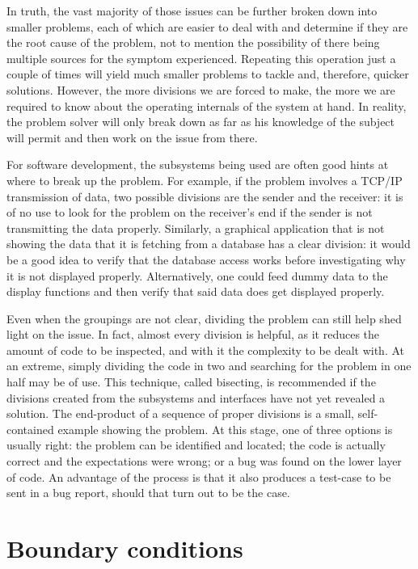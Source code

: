 In truth, the vast majority of those issues can be further broken down into smaller problems, each of which are easier to deal with and determine if they are the root cause of the problem, not to mention the possibility of there being multiple sources for the symptom experienced. Repeating this operation just a couple of times will yield much smaller problems to tackle and, therefore, quicker solutions. However, the more divisions we are forced to make, the more we are required to know about the operating internals of the system at hand. In reality, the problem solver will only break down as far as his knowledge of the subject will permit and then work on the issue from there.

For software development, the subsystems being used are often good hints at where to break up the problem. For example, if the problem involves a TCP/IP transmission of data, two possible divisions are the sender and the receiver: it is of no use to look for the problem on the receiver’s end if the sender is not transmitting the data properly. Similarly, a graphical application that is not showing the data that it is fetching from a database has a clear division: it would be a good idea to verify that the database access works before investigating why it is not displayed properly. Alternatively, one could feed dummy data to the display functions and then verify that said data does get displayed properly. 

Even when the groupings are not clear, dividing the problem can still help shed light on the issue. In fact, almost every division is helpful, as it reduces the amount of code to be inspected, and with it the complexity to be dealt with. At an extreme, simply dividing the code in two and searching for the problem in one half may be of use. This technique, called bisecting, is recommended if the divisions created from the subsystems and interfaces have not yet revealed a solution. 
The end-product of a sequence of proper divisions is a small, self-contained example showing the problem. At this stage, one of three options is usually right: the problem can be identified and located; the code is actually correct and the expectations were wrong; or a bug was found on the lower layer of code. An advantage of the process is that it also produces a test-case to be sent in a bug report, should that turn out to be the case.

\section*{Boundary conditions}

